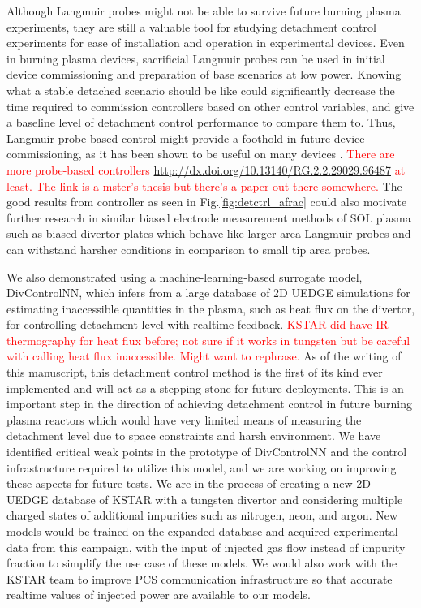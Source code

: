 Although Langmuir probes might not be able to survive future burning plasma experiments, they are still a valuable tool for studying detachment control experiments for ease of installation and operation in experimental devices.
Even in burning plasma devices, sacrificial Langmuir probes can be used in initial device commissioning and preparation of base scenarios at low power.
Knowing what a stable detached scenario should be like could significantly decrease the time required to commission controllers based on other control variables, and give a baseline level of detachment control performance to compare them to.
Thus, Langmuir probe based control might provide a foothold in future device commissioning, as it has been shown to be useful on many devices \cite{Eldon_2021_NME, Guillemaut_2017_PPCF, Yuan_2020_FED}.
\textcolor{red}{There are more probe-based controllers \url{http://dx.doi.org/10.13140/RG.2.2.29029.96487} at least. The link is a mster's thesis but there's a paper out there somewhere.}
The good results from \Afrac controller as seen in Fig.\ref{fig:detctrl_afrac} could also motivate further research in similar biased electrode measurement methods of SOL plasma such as biased divertor plates \cite{Toi_2023_NF, Cui_2024_NF} which behave like larger area Langmuir probes and can withstand harsher conditions in comparison to small tip area probes.

We also demonstrated using a machine-learning-based surrogate model, DivControlNN, which infers from a large database of 2D UEDGE simulations for estimating inaccessible quantities in the plasma, such as heat flux on the divertor, for controlling detachment level with realtime feedback.
\textcolor{red}{KSTAR did have IR thermography for heat flux before; not sure if it works in tungsten but be careful with calling heat flux inaccessible. Might want to rephrase.}
As of the writing of this manuscript, this detachment control method is the first of its kind ever implemented and will act as a stepping stone for future deployments.
This is an important step in the direction of achieving detachment control in future burning plasma reactors which would have very limited means of measuring the detachment level due to space constraints and harsh environment.
We have identified critical weak points in the prototype of DivControlNN and the control infrastructure required to utilize this model, and we are working on improving these aspects for future tests.
We are in the process of creating a new 2D UEDGE database of KSTAR with a tungsten divertor and considering multiple charged states of additional impurities such as nitrogen, neon, and argon.
New models would be trained on the expanded database and acquired experimental data from this campaign, with the input of injected gas flow instead of impurity fraction to simplify the use case of these models.
We would also work with the KSTAR team to improve PCS communication infrastructure so that accurate realtime values of injected power are available to our models.

